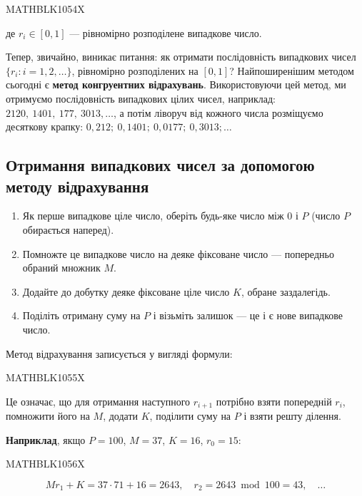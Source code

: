 \documentclass[
  ukrainian,
]{article}
\providecommand{\tightlist}{%
  \setlength{\itemsep}{0pt}\setlength{\parskip}{0pt}}
\begin{document}
MATHBLK1054X

де \(r_i \in [0, 1]\) --- рівномірно розподілене випадкове число.

Тепер, звичайно, виникає питання: як отримати послідовність випадкових
чисел \(\{r_i: i=1,2,\ldots\}\), рівномірно розподілених на \([0,1]\)?
Найпоширенішим методом сьогодні є \textbf{метод конгруентних
відрахувань}. Використовуючи цей метод, ми отримуємо послідовність
випадкових цілих чисел, наприклад: \(2120,\ 1401,\ 177,\ 3013, \ldots\),
а потім ліворуч від кожного числа розміщуємо десяткову крапку:
\(0{,}212;\ 0{,}1401;\ 0{,}0177;\ 0{,}3013; \ldots\)

\subsection{Отримання випадкових чисел за допомогою методу
відрахування}\label{ux43eux442ux440ux438ux43cux430ux43dux43dux44f-ux432ux438ux43fux430ux434ux43aux43eux432ux438ux445-ux447ux438ux441ux435ux43b-ux437ux430-ux434ux43eux43fux43eux43cux43eux433ux43eux44e-ux43cux435ux442ux43eux434ux443-ux432ux456ux434ux440ux430ux445ux443ux432ux430ux43dux43dux44f}

\begin{enumerate}
\def\labelenumi{\arabic{enumi}.}
\tightlist
\item
  Як перше випадкове ціле число, оберіть будь-яке число між \(0\) і
  \(P\) (число \(P\) обирається наперед).
\item
  Помножте це випадкове число на деяке фіксоване число --- попередньо
  обраний множник \(M\).
\item
  Додайте до добутку деяке фіксоване ціле число \(K\), обране
  заздалегідь.
\item
  Поділіть отриману суму на \(P\) і візьміть залишок --- це і є нове
  випадкове число.
\end{enumerate}

Метод відрахування записується у вигляді формули:

MATHBLK1055X

Це означає, що для отримання наступного \(r_{i+1}\) потрібно взяти
попередній \(r_i\), помножити його на \(M\), додати \(K\), поділити суму
на \(P\) і взяти решту ділення.

\textbf{Наприклад}, якщо \(P = 100\), \(M = 37\), \(K = 16\),
\(r_0 = 15\):

MATHBLK1056X

\[
M r_1 + K = 37 \cdot 71 + 16 = 2643, \quad r_2 = 2643 \bmod 100 = 43, \quad \ldots
\]
\end{document}
